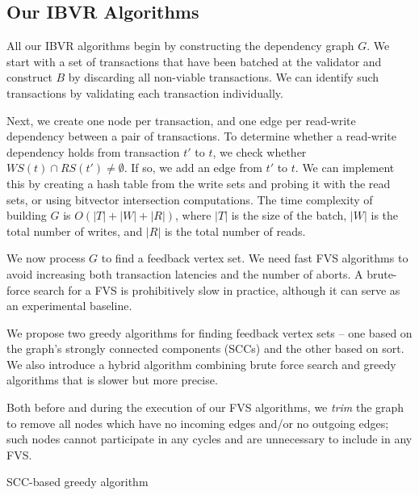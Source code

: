 \subsection{Our IBVR Algorithms}
\label{subsec:validator_reordering:algorithm}

All our IBVR algorithms begin by constructing the dependency graph $G$. We start with a set of transactions that have been batched at the validator and construct $B$ by discarding all non-viable transactions. We can identify such transactions by validating each transaction individually.

Next, we create one node per transaction, and one edge per read-write dependency between a pair of transactions. To determine whether a read-write dependency holds from transaction $t'$ to $t$, we check whether $WS(t) \cap RS(t') \neq \emptyset$. If so, we add an edge from $t'$ to $t$. We can implement this by creating a hash table from the write sets and probing it with the read sets, or using bitvector intersection computations. The time complexity of building $G$ is $O(|T|+|W|+|R|)$, where $|T|$ is the size of the batch, $|W|$ is the total number of writes, and $|R|$ is the total number of reads.

We now process $G$ to find a feedback vertex set. We need fast FVS algorithms to avoid increasing both transaction latencies and the number of aborts. A brute-force search for a FVS is prohibitively slow in practice, although it can serve as an experimental baseline.

We propose two greedy algorithms for finding feedback vertex sets -- one based on the graph's strongly connected components (SCCs) and the other based on sort. We also introduce a hybrid algorithm combining brute force search and greedy algorithms that is slower but more precise.

Both before and during the execution of our FVS algorithms, we \emph{trim} the graph to remove all nodes which have no incoming edges and/or no outgoing edges; such nodes cannot participate in any cycles and are unnecessary to include in any FVS.


\begin{algorithm}[t]
\SetAlgoLined\DontPrintSemicolon
{}


\caption{SCC-based greedy algorithm}
\label{alg:scc}
\end{algorithm}


